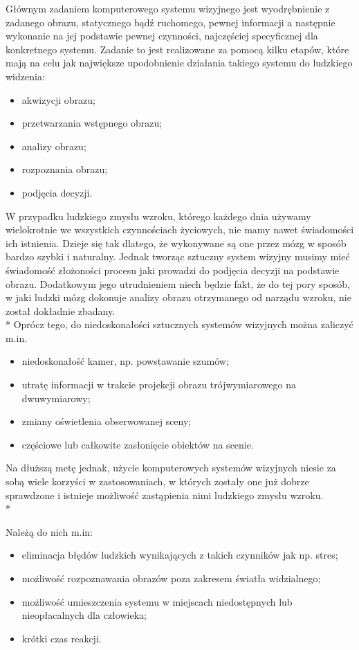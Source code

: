 Głównym zadaniem komputerowego systemu wizyjnego jest wyodrębnienie z zadanego obrazu, statycznego bądź ruchomego, pewnej informacji a następnie wykonanie na jej podstawie pewnej czynności, najczęściej specyficznej dla konkretnego systemu.
Zadanie to jest realizowane za pomocą kilku etapów, które mają na celu jak największe upodobnienie działania takiego systemu do ludzkiego widzenia:
\begin{itemize}
\item akwizycji obrazu;
\item przetwarzania wstępnego obrazu;
\item analizy obrazu;
\item rozpoznania obrazu;
\item podjęcia decyzji.
\end{itemize}

W przypadku ludzkiego zmysłu wzroku, którego każdego dnia używamy wielokrotnie we wszystkich czynnościach życiowych, nie mamy nawet świadomości ich istnienia. Dzieje się tak dlatego, że wykonywane są one przez mózg w sposób bardzo szybki i naturalny.
Jednak tworząc sztuczny system wizyjny musimy mieć świadomość złożoności procesu jaki prowadzi do podjęcia decyzji na podstawie obrazu. Dodatkowym jego utrudnieniem niech będzie fakt, że do tej pory sposób, w jaki ludzki mózg dokonuje analizy obrazu otrzymanego od narządu wzroku, nie został dokładnie zbadany.\\*
Oprócz tego, do niedoskonałości sztucznych systemów wizyjnych można zaliczyć m.in.
\begin{itemize}
\item niedoskonałość kamer, np. powstawanie szumów;
\item utratę informacji w trakcie projekcji obrazu trójwymiarowego na dwuwymiarowy;
\item zmiany oświetlenia obserwowanej sceny;
\item częściowe lub całkowite zasłonięcie obiektów na scenie.
\end{itemize}

Na dłuższą metę jednak, użycie komputerowych systemów wizyjnych niesie za sobą wiele korzyści w zastosowaniach, w których zostały one już dobrze sprawdzone i istnieje możliwość zastąpienia nimi ludzkiego zmysłu wzroku.\\*

Należą do nich m.in:
\begin{itemize}
\item eliminacja błędów ludzkich wynikających z takich czynników jak np. stres;
\item możliwość rozpoznawania obrazów poza zakresem światła widzialnego;
\item możliwość umieszczenia systemu w miejscach niedostępnych lub nieopłacalnych dla człowieka;
\item krótki czas reakcji.
\end{itemize}

